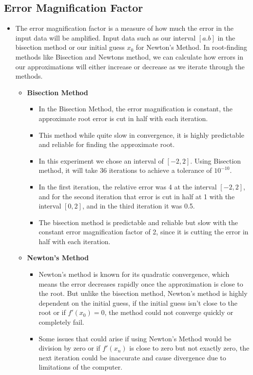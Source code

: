 \documentclass[9pt]{extarticle}
\begin{document}
\subsection{Error Magnification Factor}
\begin{itemize}
    \item The error magnification factor is a measure of how much the error in the input data will be amplified. Input data such as our interval $[a.b]$ in the bisection method or our initial guess $x_0$ for Newton's Method. In root-finding methods like Bisection and Newtons method, we can calculate how errors in our approximations will either increase or decrease as we iterate through the methods.
    \begin{itemize}
        \item \textbf{Bisection Method}
        \begin{itemize}
            \item In the Bisection Method, the error magnification is constant, the approximate root error is cut in half with each iteration.
            \item This method while quite slow in convergence, it is highly predictable and reliable for finding the approximate root.
            \item In this experiment we chose an interval of $[-2,2]$. Using Bisection method, it will take 36 iterations to achieve a tolerance of $10^{-10}$.
            \item In the first iteration, the relative error was 4 at the interval $[-2,2]$, and for the second iteration that error is cut in half at 1 with the interval $[0,2]$, and in the third iteration it was 0.5.
            \item The bisection method is predictable and reliable but slow with the constant error magnification factor of 2, since it is cutting the error in half with each iteration.
        \end{itemize}
        \item \textbf{Newton's Method}
        \begin{itemize}
            \item Newton's method is known for its quadratic convergence, which means the error decreases rapidly once the approximation is close to the root. But unlike the bisection method, Newton's method is highly dependent on the initial guess, if the initial guess isn't close to the root or if $f'(x_0) = 0$, the method could not converge quickly or completely fail.
            \item Some issues that could arise if using Newton's Method would be division by zero or if $f'(x_n)$ is close to zero but not exactly zero, the next iteration could be inaccurate and cause divergence due to limitations of the computer.

\end{itemize}
\end{itemize}
\end{itemize}
\end{document}
